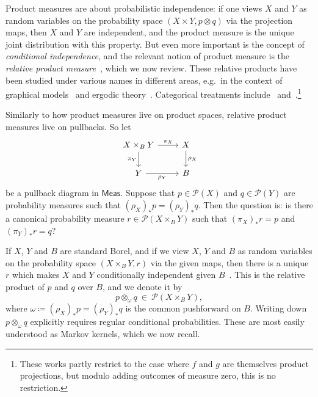 \documentclass[11pt,a4paper]{scrartcl}
\newcommand{\meas}{\mathsf{Meas}}
\newcommand{\giry}{\mathcal{P}}
\theoremstyle{definition}
\begin{document}
Product measures are about probabilistic independence: if one views $X$ and $Y$ as random variables on the probability space $(X \times Y, p \otimes q)$ via the projection maps,
then $X$ and $Y$ are independent, and the product measure is the unique joint distribution with this property.
But even more important is the concept of \emph{conditional independence},
and the relevant notion of product measure is the \emph{relative product measure}~\cite{Dawid1999},
which we now review.
These relative products have been studied under various names in different areas,
e.g.~in the context of graphical models~\cite{Dawid1999} and ergodic theory~\cite[Definition~6.15]{Einsiedler2011}.
Categorical treatments include~\cite{Flori2016,Simpson2018,Perrone2025} and~\cite[Definition~12.8]{Fritz2020}.\footnote{These works partly restrict to the case where $f$ and $g$ are themselves product projections, but modulo adding outcomes of measure zero, this is no restriction.}

Similarly to how product measures live on product spaces, relative product measures live on pullbacks.
So let
\begin{equation}
	\label{eq:pullbackdiagram}
	\begin{tikzcd}
		X \times_B Y \arrow[r, "\pi_X"] \arrow[d, "\pi_Y"'] & X \arrow[d, "\rho_X"] \\
		Y \arrow[r, "\rho_Y"'] & B
	\end{tikzcd}
\end{equation}
be a pullback diagram in $\meas$.
Suppose that $p \in \giry(X)$ and $q \in \giry(Y)$ are probability measures such that $(\rho_X)_\ast p = (\rho_Y)_\ast q$.
Then the question is: is there a canonical probability measure $r \in \giry(X \times_B Y)$ such that $(\pi_X)_\ast r = p$ and $(\pi_Y)_\ast r = q$?

If $X$, $Y$ and $B$ are standard Borel,
and if we view $X$, $Y$ and $B$ as random variables on the probability space $(X \times_B Y, r)$ via the given maps,
then there is a unique $r$ which makes $X$ and $Y$ conditionally independent given $B$~\cite[Proposition~12.9]{Fritz2020}.
This is the relative product of $p$ and $q$ over $B$, and we denote it by
\[
	p \otimes_\omega q \:\in\: \giry(X \times_B Y),
\]
where $\omega \coloneq (\rho_X)_\ast p = (\rho_Y)_\ast q$ is the common pushforward on $B$.
Writing down $p \otimes_\omega q$ explicitly requires regular conditional probabilities.
These are most easily understood as Markov kernels, which we now recall.
\end{document}
